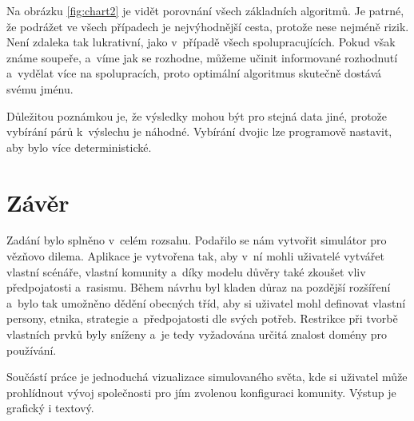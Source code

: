\documentclass[pdftex,a4paper,12pt]{extarticle}
\begin{document}
Na obrázku \ref{fig:chart2} je vidět porovnání všech základních algoritmů. Je patrné, že podrážet ve všech případech je nejvýhodnější cesta, protože nese nejméně rizik. Není zdaleka tak lukrativní, jako v~případě všech spolupracujících. Pokud však známe soupeře, a~víme jak se rozhodne, můžeme učinit informované rozhodnutí a~vydělat více na spolupracích, proto optimální algoritmus skutečně dostává svému jménu.

Důležitou poznámkou je, že výsledky mohou být pro stejná data jiné, protože vybírání párů k~výslechu je náhodné. Vybírání dvojic lze programově nastavit, aby bylo více deterministické.

\newpage
\section{Závěr}
\label{Závěr}

Zadání bylo splněno v~celém rozsahu. Podařilo se nám vytvořit simulátor pro vězňovo dilema. Aplikace je vytvořena tak, aby v~ní mohli uživatelé vytvářet vlastní scénáře, vlastní komunity a~díky modelu důvěry také zkoušet vliv předpojatosti a~rasismu. Během návrhu byl kladen důraz na pozdější rozšíření a~bylo tak umožněno dědění obecných tříd, aby si uživatel mohl definovat vlastní persony, etnika, strategie a~předpojatosti dle svých potřeb. Restrikce při tvorbě vlastních prvků byly sníženy a~je tedy vyžadována určitá znalost domény pro používání.

Součástí práce je jednoduchá vizualizace simulovaného světa, kde si uživatel může prohlídnout vývoj společnosti pro jím zvolenou konfiguraci komunity. Výstup je grafický i textový. 
\end{document}

